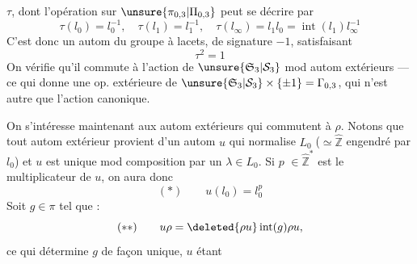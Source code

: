 $\tau$, dont l'opération sur $\unsure{\pi_{0,3}|\Pi_{0,3}}$ peut se décrire par
\[
\tau(l_0)=l_0^{-1},\quad\tau(l_1)=l_1^{-1},\quad\tau(l_\infty)=l_1l_0=\operatorname{int}(l_1)l_\infty^{-1}
\]
C'est donc un autom du groupe à lacets, de signature $-1$, satisfaisant
\[
\tau^2=1
\]
On vérifie qu'il commute à l'action de $\unsure{\mathfrak S_3|\mathcal S_3}$ mod autom extérieurs --- ce qui donne une op. extérieure de $\unsure{\mathfrak S_3|\mathcal S_3}\times\{\pm1\}=\Gamma_{0,3}$, qui n'est autre que l'action canonique.

On s'intéresse maintenant aux autom extérieurs qui commutent à $\rho$. Notons que tout autom extérieur  provient d'un autom $u$ qui normalise  $L_0$ ($\simeq\hat{\mathbb Z}$ engendré par $l_0$) et $u$ est unique mod composition par un $\lambda\in L_0$. Si $p$  $\in\hat{\mathbb Z}^{*}$  est le multiplicateur de $u$, on aura donc
\[
(*)\qquad u(l_0)=l_0^p
\]
Soit $g\in\pi$ tel que :
\[
(**)\qquad u\rho=\deleted{\rho u}\operatorname{int}(g)\rho u,
\]
ce qui détermine $g$ de façon unique, $u$ étant
